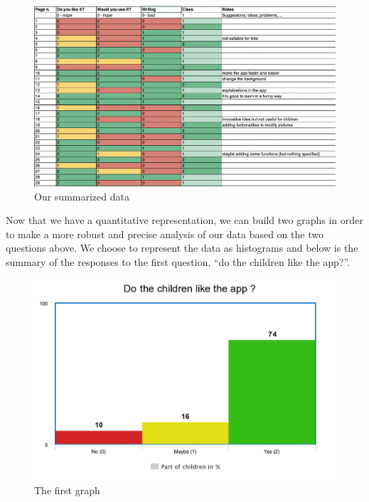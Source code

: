 \documentclass[12pt]{scrartcl}
\begin{document}
			\begin{figure}[H]
                        		\centering
               			\includegraphics[width=\textwidth]{../images/image_1_data_analysis.png}
               			\caption{Our summarized data}
                        		\label{analysis1}
      			\end{figure}

			Now that we have a quantitative representation, we can build two graphs in order to make a more robust and precise analysis of our data based on the two questions above. We choose to represent the data as histograms and below is the summary of the responses to the first question, “do the children like the app?”.

			\begin{figure}[H]
                        		\centering
               			\includegraphics[width=\textwidth]{../images/image_2_data_analysis.jpeg}
               			\caption{The first graph}
                        		\label{analysis2}
      			\end{figure}
\end{document}
